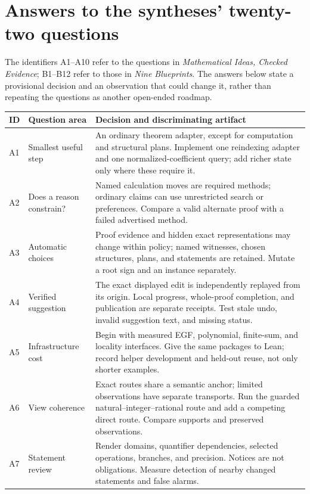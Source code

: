 \documentclass[11pt,a4paper]{article}
\theoremstyle{definition}
\begin{document}
\appendix
\section{Answers to the syntheses' twenty-two questions}\label{app:questions}
The identifiers A1--A10 refer to the questions in \emph{Mathematical Ideas,
Checked Evidence}; B1--B12 refer to those in \emph{Nine Blueprints}. The answers
below state a provisional decision and an observation that could change it,
rather than repeating the questions as another open-ended roadmap.

\small
{}
\begin{longtable}{@{}P{.065\textwidth}P{.23\textwidth}P{.615\textwidth}@{}}
\toprule
ID & Question area & Decision and discriminating artifact\\
\midrule\endhead
A1 & Smallest useful step & An ordinary theorem adapter, except for computation and structural plans. Implement one reindexing adapter and one normalized-coefficient query; add richer state only where these require it.\\
A2 & Does a reason constrain? & Named calculation moves are required methods; ordinary claims can use unrestricted search or preferences. Compare a valid alternate proof with a failed advertised method.\\
A3 & Automatic choices & Proof evidence and hidden exact representations may change within policy; named witnesses, chosen structures, plans, and statements are retained. Mutate a root sign and an instance separately.\\
A4 & Verified suggestion & The exact displayed edit is independently replayed from its origin. Local progress, whole-proof completion, and publication are separate receipts. Test stale undo, invalid suggestion text, and missing status.\\
A5 & Infrastructure cost & Begin with measured EGF, polynomial, finite-sum, and locality interfaces. Give the same packages to Lean; record helper development and held-out reuse, not only shorter examples.\\
A6 & View coherence & Exact routes share a semantic anchor; limited observations have separate transports. Run the guarded natural--integer--rational route and add a competing direct route. Compare supports and preserved observations.\\
A7 & Statement review & Render domains, quantifier dependencies, selected operations, branches, and precision. Notices are not obligations. Measure detection of nearby changed statements and false alarms.\\

\end{longtable}
\end{document}
